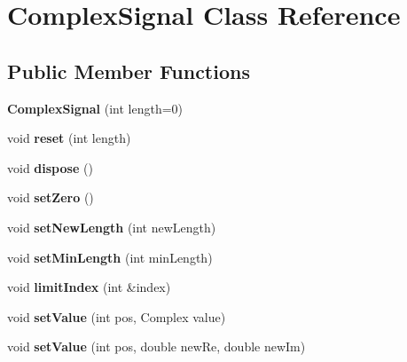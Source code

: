 \hypertarget{class_complex_signal}{}\section{Complex\+Signal Class Reference}
\label{class_complex_signal}
\subsection*{Public Member Functions}
\begin{DoxyCompactItemize}
\item 
\mbox{\label{class_complex_signal_a2e11b8f8265816c4f46f3590dff29618}} 
{\bfseries Complex\+Signal} (int length=0)
\item 
\mbox{\label{class_complex_signal_a40646e577fafc4fa2fc8edd580760ae5}} 
void {\bfseries reset} (int length)
\item 
\mbox{\label{class_complex_signal_a6501545e89608ae7339115a0b72ea469}} 
void {\bfseries dispose} ()
\item 
\mbox{\label{class_complex_signal_ab931ad32748e9c59f3ae23e9595f7a3e}} 
void {\bfseries set\+Zero} ()
\item 
\mbox{\label{class_complex_signal_a9a8c5a7e5293fad7aa4b66a7cc13aee8}} 
void {\bfseries set\+New\+Length} (int new\+Length)
\item 
\mbox{\label{class_complex_signal_aa149355b9c64e4ea62a2d57b7e5af3dc}} 
void {\bfseries set\+Min\+Length} (int min\+Length)
\item 
\mbox{\label{class_complex_signal_a4924cb30b2db39cbe1eda4fd4c34a4ea}} 
void {\bfseries limit\+Index} (int \&index)
\item 
\mbox{\label{class_complex_signal_a8b3e3b2214fd25c998725633e860eddc}} 
void {\bfseries set\+Value} (int pos, Complex value)
\item 
\mbox{\label{class_complex_signal_a76ce2ddc7b997cb16dac9a764bcf81d2}} 
void {\bfseries set\+Value} (int pos, double new\+Re, double new\+Im)

\end{DoxyCompactItemize}
